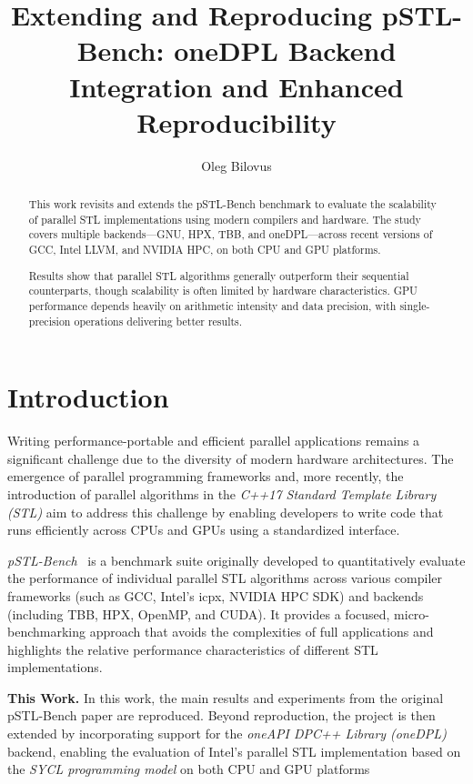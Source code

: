 \documentclass[sigconf]{acmart}
\title{Extending and Reproducing pSTL-Bench: oneDPL Backend Integration and Enhanced Reproducibility}
\author{Oleg Bilovus}
\affiliation{
  \institution{Department of Computer Science, University of Salerno}
  \city{Fisciano (SA)}
  \country{Italy}
}
\newcommand{\mypar}[1]{{\bf #1.}}
\begin{document}
\begin{abstract}
      This work revisits and extends the pSTL-Bench benchmark to evaluate the
      scalability of parallel STL implementations using modern compilers and hardware.
      The study covers multiple backends—GNU, HPX, TBB, and oneDPL—across recent
      versions of GCC, Intel LLVM, and NVIDIA HPC, on both CPU and GPU platforms.

      Results show that parallel STL algorithms generally outperform their sequential
      counterparts, though scalability is often limited by hardware characteristics.
      GPU performance depends heavily on arithmetic intensity and data precision,
      with single-precision operations delivering better results.
\end{abstract}

\maketitle

\section{Introduction}\label{sec:intro}
Writing performance-portable and efficient parallel applications remains a
significant challenge due to the diversity of modern hardware architectures.
The emergence of parallel programming frameworks and, more recently, the
introduction of parallel algorithms in the \textit{C++17 Standard Template
      Library (STL)} aim to address this challenge by enabling developers to write
code that runs efficiently across CPUs and GPUs using a standardized interface.

\textit{pSTL-Bench}~\cite{pSTL-Bench} is a benchmark suite originally developed to
quantitatively evaluate the performance of individual parallel STL algorithms
across various compiler frameworks (such as GCC, Intel's icpx, NVIDIA HPC SDK)
and backends (including TBB, HPX, OpenMP, and CUDA). It provides a focused,
micro-benchmarking approach that avoids the complexities of full applications
and highlights the relative performance characteristics of different STL
implementations.

\mypar{This Work} In this work, the main results and experiments from the original pSTL-Bench
paper are reproduced. Beyond reproduction, the project is then extended by
incorporating support for the \textit{oneAPI DPC++ Library (oneDPL)} backend,
enabling the evaluation of Intel’s parallel STL implementation based on the
\textit{SYCL programming model} on both CPU and GPU platforms
\end{document}
